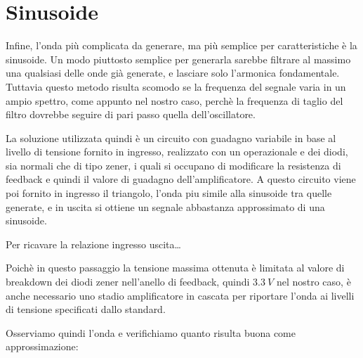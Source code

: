 
\section{Sinusoide}


Infine, l'onda più complicata da generare, ma più semplice per caratteristiche è la sinusoide.
Un modo piuttosto semplice per generarla sarebbe filtrare al massimo una qualsiasi delle onde
già generate, e lasciare solo l'armonica fondamentale. Tuttavia questo metodo risulta scomodo
se la frequenza del segnale varia in un ampio spettro, come appunto nel nostro caso, perchè la
frequenza di taglio del filtro dovrebbe seguire di pari passo quella dell'oscillatore.

La soluzione utilizzata quindi è un circuito con guadagno variabile in base al livello di
tensione fornito in ingresso, realizzato con un operazionale e dei diodi, sia normali che di
tipo zener, i quali si occupano di modificare la resistenza di feedback e quindi il valore di
guadagno dell'amplificatore. A questo circuito viene poi fornito in ingresso il triangolo,
l'onda piu simile alla sinusoide tra quelle generate, e in uscita si ottiene un segnale
abbastanza approssimato di una sinusoide.


Per ricavare la relazione ingresso uscita\dots


Poichè in questo passaggio la tensione massima ottenuta è limitata al valore di breakdown
dei diodi zener nell'anello di feedback, quindi $3.3\ V$ nel nostro caso, è anche necessario
uno stadio amplificatore in cascata per riportare l'onda ai livelli di tensione specificati
dallo standard.


Osserviamo quindi l'onda e verifichiamo quanto risulta buona come approssimazione:


